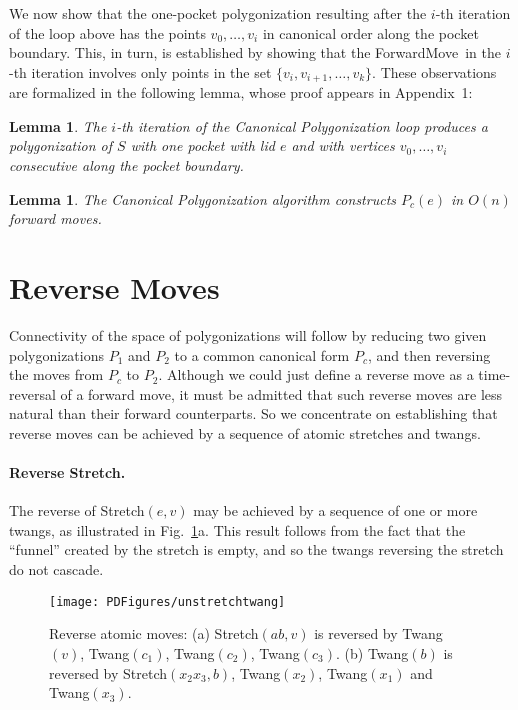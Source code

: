 \pdfoutput=1  \documentclass{article}
\def\st{{\sc Stretch}}
\def\tw{{\sc Twang}}
\def\fm{{\sc ForwardMove}}
\newtheorem{lemma}[theorem]{Lemma}
\newcommand{\lemlab}[1]{\label{lemma:#1}}
\newcommand{\figlab}[1]{\label{fig:#1}}
\newcommand{\seclab}[1]{\label{sec:#1}}
\newcommand{\figref}[1]{\ref{fig:#1}}
\begin{document}
We now show that the one-pocket polygonization resulting after the
$i$-th iteration of the loop above has the points $v_0, \ldots, v_i$
in canonical order along the pocket boundary. This, in turn, is
established by showing that the \fm\ in the $i$-th iteration
involves only points in the set $\{v_i, v_{i+1},\ldots, v_k\}$.
These observations are formalized in the following lemma, whose
proof appears in Appendix~1:

\begin{lemma}
The $i$-th iteration of the {\sc Canonical Polygonization} loop
produces a polygonization of $S$ with one pocket with lid $e$ and
with vertices $v_0,\ldots, v_i$ consecutive along the pocket
boundary. \lemlab{canonical.first}
\end{lemma}

\begin{lemma}
The {\sc Canonical Polygonization} algorithm constructs $P_c(e)$ in
$O(n)$ forward moves. \lemlab{canonical.final}
\end{lemma}


\vspace{-1.5em}
\section{Reverse Moves}
\seclab{Reverse}
Connectivity of the space of polygonizations will follow by reducing
two given polygonizations $P_1$ and $P_2$ to a common canonical form
$P_c$, and then reversing the moves from $P_c$ to $P_2$.
Although we could just define a reverse move as a
time-reversal of a forward move, it must be admitted that such
reverse moves are less natural than their forward counterparts.  So
we concentrate on establishing that reverse moves can be achieved by
a sequence of atomic stretches and twangs.

\vspace{-0.5em}
\paragraph{Reverse Stretch.} The reverse of \st$(e,v)$ may be achieved by a
sequence of one or more twangs, as illustrated in
Fig.~\figref{unstretchtwang}a. This result follows from the fact
that the ``funnel'' created by the stretch is empty, and so the
twangs reversing the stretch do not cascade.


\begin{figure}[htbp]
\centering
\texttt{[image: PDFigures/unstretchtwang]}
\caption{Reverse atomic moves: (a) \st$(ab, v)$ is reversed by
\tw$(v)$, \tw$(c_1)$, \tw$(c_2)$, \tw$(c_3)$. (b) \tw$(b)$ is
reversed by \st$(x_2x_3,b)$, \tw$(x_2)$, \tw$(x_1)$ and \tw$(x_3)$.}
\figlab{unstretchtwang}
\end{figure}
\end{document}
